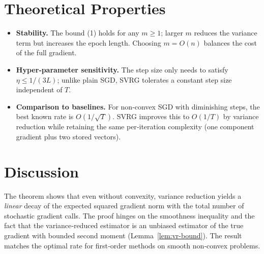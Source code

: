 \documentclass{article}
\begin{document}
\section*{Theoretical Properties}
\begin{itemize}
\item \textbf{Stability.} The bound (1) holds for any $m\ge 1$; larger $m$ reduces the variance term but increases the epoch length. Choosing $m=O(n)$ balances the cost of the full gradient.
\item \textbf{Hyper‑parameter sensitivity.} The step size only needs to satisfy $\eta\le 1/(3L)$; unlike plain SGD, SVRG tolerates a constant step size independent of $T$.
\item \textbf{Comparison to baselines.} For non‑convex SGD with diminishing steps, the best known rate is $O(1/\sqrt{T})$. SVRG improves this to $O(1/T)$ by variance reduction while retaining the same per‑iteration complexity (one component gradient plus two stored vectors).
\end{itemize}

\section*{Discussion}
The theorem shows that even without convexity, variance reduction yields a \emph{linear} decay of the expected squared gradient norm with the total number of stochastic gradient calls. The proof hinges on the smoothness inequality and the fact that the variance‑reduced estimator is an unbiased estimator of the true gradient with bounded second moment (Lemma~\ref{lem:vr-bound}). The result matches the optimal rate for first‑order methods on smooth non‑convex problems.
\end{document}
